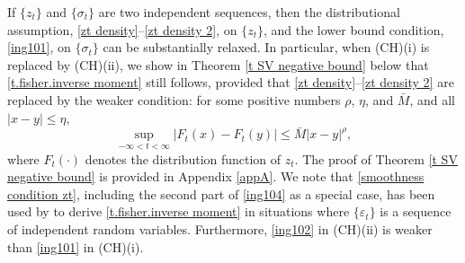\documentclass[ejsv2]{imsart}
\theoremstyle{plain}
\theoremstyle{definition}
\theoremstyle{remark}
\begin{document}
If
$\{z_t\}$ and $\{\sigma_t\}$ are two independent sequences,
then the distributional assumption,
\eqref{zt density}--\eqref{zt density 2}, on $\{z_t\}$,
and the lower bound condition, \eqref{ing101},
on $\{\sigma_t\}$
can be substantially relaxed. In particular,
when (CH)(i) is replaced by (CH)(ii),
we show in Theorem \ref{t SV negative bound} below that
\eqref{t.fisher.inverse moment} still follows, provided that
\eqref{zt density}--\eqref{zt density 2}
 are replaced by the weaker condition:
for some positive numbers $\rho$, $\eta$, and $\bar{M}$,
and all $|x-y|\leq\eta$,
\begin{equation}\label{smoothness condition zt}
\sup_{-\infty<t<\infty}
|F_t(x)-F_t(y)|\leq \bar{M}|x-y|^\rho,
\end{equation}
where $F_t(\cdot)$ denotes the distribution function of $z_t$.
The proof of Theorem \ref{t SV negative bound} is provided in Appendix \ref{appA}.
We note that \eqref{smoothness condition zt},
including the second part of \eqref{ing104}
as a special case, has been used by
\cite{Ing2003} to derive
\eqref{t.fisher.inverse moment}
in situations where $\{\varepsilon_t\}$
is a sequence of independent random variables.
Furthermore, \eqref{ing102} in (CH)(ii) is weaker than
\eqref{ing101} in (CH)(i).
\end{document}
